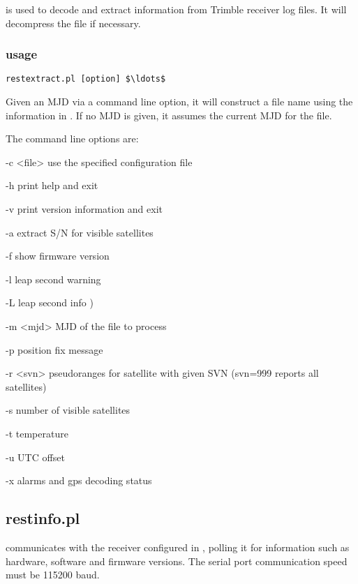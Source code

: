  is used to decode and extract information from Trimble receiver log files. 
It will decompress the file if necessary.

\subsubsection{usage}

\begin{lstlisting}[mathescape=true]
restextract.pl [option] $\ldots$ 
\end{lstlisting}

Given an MJD via a command line option, it will construct a file name using the information in . If no MJD is given, it assumes the current MJD for the file.

The command line options are:
\begin{description*}
	\item[-c \textless{file}\textgreater] use the specified configuration file
	\item[-h] print help and exit
	\item[-v] print version information and exit
  \item[-a] extract S/N for visible satellites 
	\item[-f] show firmware version
  \item[-l] leap second warning
  \item[-L] leap second info )
  \item[-m \textless{mjd}\textgreater]  MJD of the file to process
  \item[-p] position fix message
  \item[-r \textless{svn}\textgreater] pseudoranges for satellite with given SVN 
			(svn=999 reports all satellites)
  \item[-s] number of visible satellites
  \item[-t] temperature 
  \item[-u] UTC offset 
  \item[-x] alarms and gps decoding status
\end{description*}

\subsection{restinfo.pl} \hypertarget{h:restinfo}{}

 communicates with the receiver configured in ,
polling it for information such as hardware, software and firmware versions.
The serial port communication speed must be 115200 baud. 

